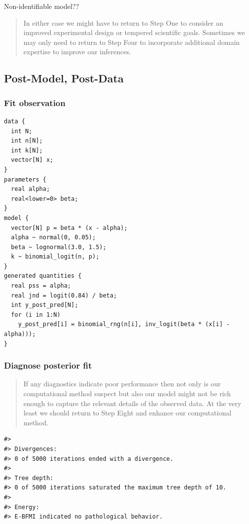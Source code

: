 \documentclass[11pt, oneside, openany]{scrbook}
\begin{document}
Non-identifiable model??

\begin{quote}
In either case we might have to return to Step One to consider an improved experimental design or tempered scientific goals. Sometimes we may only need to return to Step Four to incorporate additional domain expertise to improve our inferences.
\end{quote}

\hypertarget{post-model-post-data}{%
\subsection{Post-Model, Post-Data}\label{post-model-post-data}}

\hypertarget{iter1-fit-obs}{%
\subsubsection{Fit observation}\label{iter1-fit-obs}}


\begin{verbatim}
data {
  int N;
  int n[N];
  int k[N];
  vector[N] x;
}
parameters {
  real alpha;
  real<lower=0> beta;
}
model {
  vector[N] p = beta * (x - alpha);
  alpha ~ normal(0, 0.05);
  beta ~ lognormal(3.0, 1.5);
  k ~ binomial_logit(n, p);
}
generated quantities {
  real pss = alpha;
  real jnd = logit(0.84) / beta;
  int y_post_pred[N];
  for (i in 1:N)
    y_post_pred[i] = binomial_rng(n[i], inv_logit(beta * (x[i] - alpha)));
}
\end{verbatim}


\hypertarget{iter1-diagnose-post}{%
\subsubsection{Diagnose posterior fit}\label{iter1-diagnose-post}}

\begin{quote}
If any diagnostics indicate poor performance then not only is our computational method suspect but also our model might not be rich enough to capture the relevant details of the observed data. At the very least we should return to Step Eight and enhance our computational method.
\end{quote}


\begin{verbatim}
#> 
#> Divergences:
#> 0 of 5000 iterations ended with a divergence.
#> 
#> Tree depth:
#> 0 of 5000 iterations saturated the maximum tree depth of 10.
#> 
#> Energy:
#> E-BFMI indicated no pathological behavior.
\end{verbatim}
\end{document}
